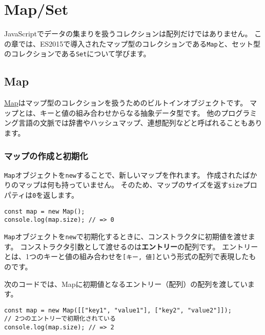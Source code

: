 \hypertarget{map-and-set}{%
\chapter[Map/Set]{Map/Set\,\protect{}}\label{map-and-set}}
\thispagestyle{frontheadings}

JavaScriptでデータの集まりを扱うコレクションは配列だけではありません。
この章では、ES2015で導入されたマップ型のコレクションである\texttt{Map}と、セット型のコレクションである\texttt{Set}について学びます。

\hypertarget{map}{%
\section{Map}\label{map}}

\href{https://developer.mozilla.org/ja/docs/Web/JavaScript/Reference/Global_Objects/Map}{Map}はマップ型のコレクションを扱うためのビルトインオブジェクトです。
マップとは、キーと値の組み合わせからなる抽象データ型です。
他のプログラミング言語の文脈では辞書やハッシュマップ、連想配列などと呼ばれることもあります。

\hypertarget{map-new}{%
\subsection{マップの作成と初期化}\label{map-new}}

\texttt{Map}オブジェクトを\texttt{new}することで、新しいマップを作れます。
作成されたばかりのマップは何も持っていません。
そのため、マップのサイズを返す\texttt{size}プロパティは\texttt{0}を返します。

\begin{lstlisting}
const map = new Map();
console.log(map.size); // => 0
\end{lstlisting}

\texttt{Map}オブジェクトを\texttt{new}で初期化するときに、コンストラクタに初期値を渡せます。
コンストラクタ引数として渡せるのは\textbf{エントリー}の配列です。
エントリーとは、1つのキーと値の組み合わせを\texttt{[キー, 値]}という形式の配列で表現したものです。

次のコードでは、Mapに初期値となるエントリー（配列）の配列を渡しています。

\begin{lstlisting}
const map = new Map([["key1", "value1"], ["key2", "value2"]]);
// 2つのエントリーで初期化されている
console.log(map.size); // => 2
\end{lstlisting}


